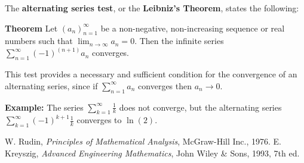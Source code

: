 \documentclass[12pt]{article}
\begin{document}
The {\bf alternating series test}, or
the {\bf Leibniz's Theorem}, states the following:

{\bf Theorem} \cite{rudin, kreyszig93}
Let $(a_n)_{n=1}^\infty$ be a non-negative, non-increasing sequence 
or real numbers such that $\lim_{n \rightarrow \infty} a_n = 0$.  
Then the infinite series $\sum_{n=1}^\infty (-1)^{(n+1)} a_n$ converges.

This test provides a necessary and sufficient condition for the convergence of an alternating series, since if $\sum_{n=1}^\infty a_n$ converges then $a_n\to 0$. 

{\bf Example:}  The series
$\sum_{k = 1}^{\infty}\frac{1}{k}$
does not converge, but the alternating series
$\sum_{k = 1}^{\infty}(-1)^{k+1}\frac{1}{k}$
converges to $\ln(2)$.

\begin{thebibliography}{9}
 W. Rudin, \emph{Principles of Mathematical Analysis}, McGraw-Hill Inc., 1976.
  E. Kreyszig,
 \emph{Advanced Engineering Mathematics},
 John Wiley \& Sons, 1993, 7th ed.
 \end{thebibliography}
\end{document}
